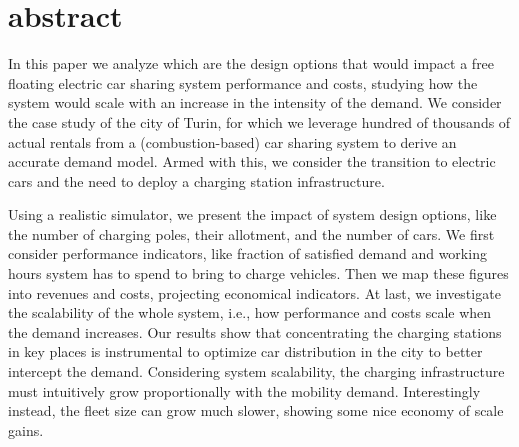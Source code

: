 \section{abstract}
\label{sec:10_0_abstract}

In this paper we analyze which are the design options that would impact a free floating electric car sharing system performance and costs, studying how the system would scale with an increase in the intensity of the demand.
We consider the case study of the city of Turin, for which we leverage hundred of thousands of actual rentals from a (combustion-based) car sharing system to derive an accurate demand model. Armed with this, we consider the transition to  electric cars and the need to deploy a charging station infrastructure.

Using a realistic simulator, we present the impact of system design options, like the number of charging poles, their allotment, and the number of cars. We first consider performance indicators, like fraction of satisfied demand and working hours system has to spend to bring to charge vehicles. Then we map these figures into revenues and costs, projecting economical indicators. 
At last, we investigate the scalability of the whole system, i.e., how performance and costs scale when the demand increases.
Our results show that concentrating the charging stations in key places is instrumental to optimize car distribution in the city to better intercept the demand.
Considering system scalability, the charging infrastructure must intuitively grow proportionally with the mobility demand.
Interestingly instead, the fleet size can grow much slower, showing some nice economy of scale gains.


